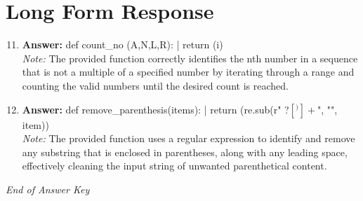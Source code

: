 \documentclass[12pt]{article}
\begin{document}
\section*{Long Form Response}
\begin{enumerate}[label=\arabic*.]
\setcounter{enumi}{10}
\item \textbf{Answer:} def count\_no (A,N,L,R): | return (i)
\\ \textit{Note:} The provided function correctly identifies the nth number in a sequence that is not a multiple of a specified number by iterating through a range and counting the valid numbers until the desired count is reached.
\item \textbf{Answer:} def remove\_parenthesis(items): | return (re.sub(r" ?\([^)]+\)", "", item))
\\ \textit{Note:} The provided function uses a regular expression to identify and remove any substring that is enclosed in parentheses, along with any leading space, effectively cleaning the input string of unwanted parenthetical content.
\end{enumerate}

\vfill
\noindent\textit{End of Answer Key}
\end{document}
